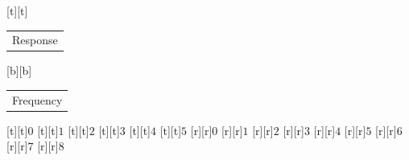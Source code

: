 %    
%
%
\begin{psfrags}%
\psfragscanon%
%
[t][t]{\color[rgb]{0,0,0}\setlength{\tabcolsep}{0pt}\begin{tabular}{c}\Large{}Response\end{tabular}}%
[b][b]{\color[rgb]{0,0,0}\setlength{\tabcolsep}{0pt}\begin{tabular}{c}\Large{}Frequency\end{tabular}}%
%
[t][t]{$0$}%
[t][t]{$1$}%
[t][t]{$2$}%
[t][t]{$3$}%
[t][t]{$4$}%
[t][t]{$5$}%
%
[r][r]{$0$}%
[r][r]{$1$}%
[r][r]{$2$}%
[r][r]{$3$}%
[r][r]{$4$}%
[r][r]{$5$}%
[r][r]{$6$}%
[r][r]{$7$}%
[r][r]{$8$}%
%
%
\end{psfrags}%
%

